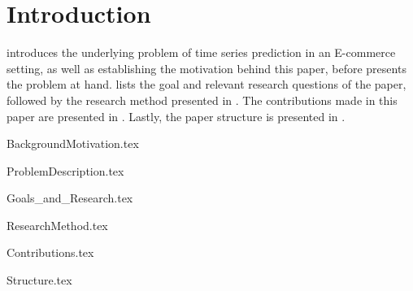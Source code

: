 \chapter{Introduction}
\label{cha:Introduction}

introduces the underlying problem of time series prediction in an E-commerce setting,
as well as establishing the motivation behind this paper,
before 
presents the problem at hand.
 lists the goal and relevant research questions of the paper,
followed by the research method presented in .
The contributions made in this paper are presented in .
Lastly, the paper structure is presented in .


\iffalse
  All chapters should begin with an introduction before any sections begin. Further, each sections begins with an introduction before  subsections begin. Chapters with just one section or sections with just one sub-section, should be avoided. Think carefully about chapter and section titles as each title stand alone in the table of contents (without associated text) and should convey meaning for the contents of the chapter or section.

  In all chapters and sections it is important to write clearly and concisely. Avoid repetitions and if needed, refer back to the original discussion or presentation. Each new section, subsection or paragraph should provide the reader with new information and be written in your own words. Avoid direct quotes. If you use direct quotes, unless the quote itself is very significant, you are conveying to the reader that you are unable to express this discussion or fact yourself. Such direct quotes also break the flow of the language (yours to someone else's).
\fi


{BackgroundMotivation.tex}

{ProblemDescription.tex}

{Goals_and_Research.tex}

{ResearchMethod.tex}

{Contributions.tex}

{Structure.tex}

